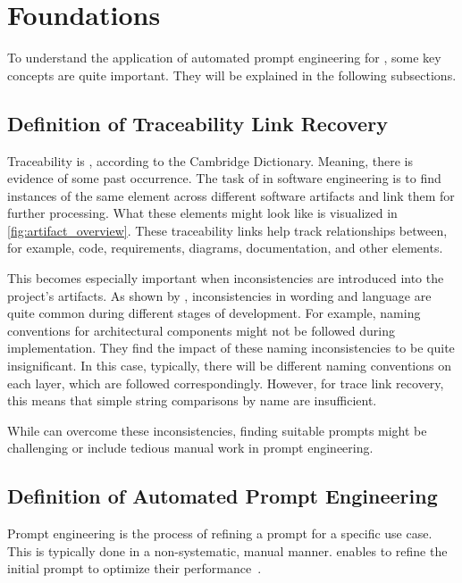 \chapter{Foundations}

To understand the application of automated prompt engineering for \TLR, some key concepts are quite important.
They will be explained in the following subsections.


\section{Definition of Traceability Link Recovery}
Traceability is , according to the Cambridge Dictionary.
Meaning, there is evidence of some past occurrence.
The task of \TLR in software engineering is to find instances of the same element across different software artifacts and link them for further processing.
What these elements might look like is visualized in \autoref{fig:artifact_overview}.
These traceability links help track relationships between, for example, code, requirements, diagrams, documentation, and other elements.

This becomes especially important when inconsistencies are introduced into the project's artifacts.
As shown by , inconsistencies in wording and language are quite common during different stages of development.
For example, naming conventions for architectural components might not be followed during implementation.
They find the impact of these naming inconsistencies to be quite insignificant.
In this case, typically, there will be different naming conventions on each layer, which are followed correspondingly.
However, for trace link recovery, this means that simple string comparisons by name are insufficient.

While \LLMs can overcome these inconsistencies, finding suitable prompts might be challenging or include tedious manual work in prompt engineering. 


\section{Definition of Automated Prompt Engineering}
\label{foundations:sec:automated_prompt_engineering}
Prompt engineering is the process of refining a prompt for a specific use case.
This is typically done in a non-systematic, manual manner. \APE enables \LLMs to refine the initial prompt to optimize their performance~\cite{zadenoori2025AutomaticPrompt}.

